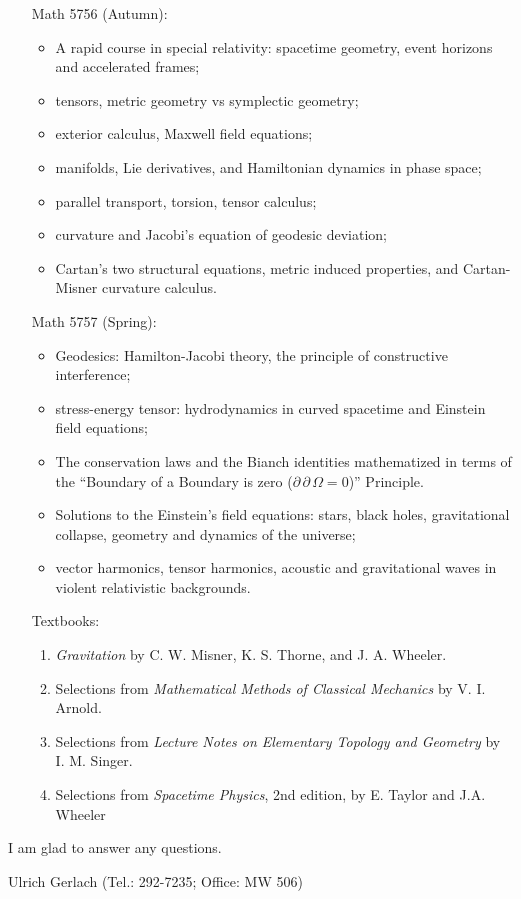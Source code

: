 \documentclass{ximera}
\begin{document}
\begin{enumerate}
\item[Math 5756 (Autumn):]
  \begin{itemize}
    \item  A rapid course in special relativity: spacetime geometry, 
      event horizons and accelerated frames;
    \item  tensors, metric geometry vs symplectic geometry;
    \item  exterior calculus, Maxwell field equations;
    \item  manifolds, Lie derivatives, and Hamiltonian dynamics in
           phase space;
    \item  parallel transport, torsion, tensor calculus;
    \item  curvature and Jacobi's equation of geodesic deviation;
    \item   Cartan's two structural equations, metric induced properties,
           and Cartan-Misner curvature calculus.
  \end{itemize}
\item[Math 5757 (Spring):]
  \begin{itemize}
    \item Geodesics: Hamilton-Jacobi theory, the principle of constructive
      interference;
    \item  stress-energy tensor: hydrodynamics in curved
           spacetime and Einstein field equations; 
    \item
      The conservation laws and the Bianch identities mathematized in terms of the ``Boundary of a Boundary is zero ($\partial\,\partial\, \Omega =0$)'' Principle.
    \item  Solutions to the Einstein's field equations: stars, black holes, gravitational collapse,  geometry and  dynamics of the universe; 
    \item vector harmonics, tensor harmonics, acoustic and
    gravitational waves in violent relativistic backgrounds.
  \end{itemize}
\item[Textbooks:]
  \begin{enumerate}
    \item
      \emph{Gravitation}  by C. W. Misner, K. S. Thorne, and J. A. Wheeler.
    \item
      Selections from \emph{Mathematical Methods of Classical Mechanics}
                by V. I. Arnold.
    \item
      Selections from \emph{Lecture Notes on Elementary Topology and
                Geometry}  by I. M. Singer.
    \item
      Selections from \emph{Spacetime Physics}, 2nd edition, by E. Taylor
                and J.A. Wheeler
  \end{enumerate}
\end{enumerate}

I am glad to answer any questions.

Ulrich Gerlach (Tel.: 292-7235; Office: MW 506)\\
~\\
\end{document}
